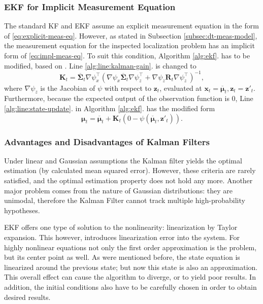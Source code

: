 \subsubsection{EKF for Implicit Measurement Equation}

The standard KF and EKF assume an explicit measurement equation in the form of \eqref{eq:explicit-meas-eq}.
However, as stated in Subsection \ref{subsec:dt-meas-model}, the measurement equation for the inspected
localization problem has an implicit form of \eqref{eq:impl-meas-eq}.
To suit this condition, Algorithm \ref{alg:ekf}. has to be modified, based on \cite{Steffen2013,Zhang2012}.
Line \ref{alg:line:kalman-gain}. is changed to
\begin{equation}
  \mathbf{K}_t = \overline{\mathbf{\Sigma}}_t\nabla \psi_x^\top\left(\nabla \psi_x\overline{\mathbf{\Sigma}}_t\nabla \psi_z^\top+
  \nabla \psi_z\mathbf{R}_t\nabla \psi^{\top}_z\right)^{-1},
\end{equation}
where $\nabla \psi_z$ is the Jacobian of $\psi$ with respect to $\mathbf{z}_t$, evaluated at
$\mathbf{x}_t = \overline{\boldsymbol{\mu}}_t, \mathbf{z}_t = \mathbf{z}'_t$.
Furthermore, because the expected output of the observation function is 0, Line \ref{alg:line:state-update}. in Algorithm \ref{alg:ekf}. has the modified form
\begin{equation}
  \boldsymbol{\mu}_t = \overline{\boldsymbol{\mu}}_t + \mathbf{K}_t\left(0-\psi(\overline{\boldsymbol{\mu}}_t,\mathbf{z}'_t)\right).
\end{equation}
\subsubsection{Advantages and Disadvantages of Kalman Filters}

Under linear and Gaussian assumptions the Kalman filter yields the optimal estimation (by calculated mean squared error). However, these criteria are rarely satisfied, and the optimal estimation property does not hold any more. Another major problem comes from the nature of Gaussian distributions: they are unimodal, therefore the Kalman Filter cannot track multiple high-probability hypotheses.

EKF offers one type of solution to the nonlinearity: linearization by Taylor expansion. This however, introduces linearization error into the system. For highly nonlinear equations not only the first order approximation is the problem, but its center point as well. As were mentioned before, the state equation is linearized around the previous state; but now this state is also an approximation. This overall effect can cause the algorithm to diverge, or to yield poor results. In addition, the initial conditions also have to be carefully chosen in order to obtain desired results.

